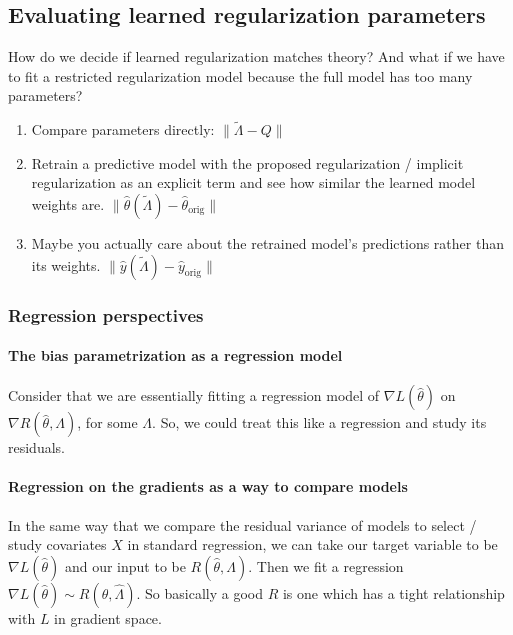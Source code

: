 \documentclass[10pt]{article}
\begin{document}

{\color{red}
\subsection{Evaluating learned regularization parameters}
\label{sec:model-eval}

How do we decide if learned regularization matches theory? And what if we have to fit a restricted regularization model because the full model has too many parameters?
\begin{enumerate}
    \item Compare parameters directly:
    \( \| \tilde{\Lambda}-Q\| \)
    \item Retrain a predictive model with the proposed regularization / implicit regularization as an explicit term and see how similar the learned model weights are.
    \(\|\hat{\theta}(\tilde{\Lambda}) - \hat{\theta}_\text{orig} \|\)
    \item Maybe you actually care about the retrained model's predictions rather than its weights.
    \( \|\hat{y}(\tilde{\Lambda}) - \hat{y}_\text{orig} \| \)
\end{enumerate}

\subsubsection{Regression perspectives}
\paragraph{The bias parametrization as a regression model}
Consider that we are essentially fitting 
a regression model of 
$\nabla L(\hat{\theta})$
on 
$\nabla R (\hat{\theta}, \Lambda)$, for some $\Lambda$. 
So, we could treat this like a regression and study its residuals.
\paragraph{Regression on the gradients as a way to compare models}
In the same way that we compare the residual variance of models to select / study covariates $X$ in standard regression, 
we can take our target variable to be $\nabla L (\hat{\theta})$ and our input to be $R(\hat{\theta}, \Lambda)$. 
Then we fit a regression $ \nabla L (\hat{\theta}) \sim R(\hat{\theta}, \hat{\Lambda})$. 
So basically a good $R$ is one which has a tight relationship with $L$ in gradient space.  

}
\end{document}
